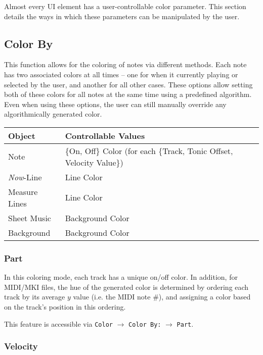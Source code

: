 \documentclass[english]{article}
\makeatletter
\newenvironment{restoretext}%
    {\@parboxrestore%
     \begin{adjustwidth}{}{\leftmargin}%
    }{\end{adjustwidth}
     }
\def\rcbegin{\begin{restoretext}\centering}
\def\rcend{\end{restoretext}}
\providecommand{\mi}[1]{\texttt{#1}}
\makeatother
\begin{document}
Almost every UI element has a user-controllable color parameter. This section details the ways in which these
parameters can be manipulated by the user.

\subsection{Color By}

This function allows for the coloring of notes via different methods. Each note has two associated colors at all times --
one for when it currently playing or selected by the user, and another for all other cases. These options allow
setting both of these colors for all notes at the same time using a predefined algorithm. Even when using these options,
the user can still manually override any algorithmically generated color.

\vspace{1em}

\rcbegin
\begin{tabular}{|l|l|}
  \hline
  \textbf{Object}           & \textbf{Controllable Values} \\
  \hline
  Note                    & \{On, Off\} Color (for each \{Track, Tonic Offset, Velocity Value\})\\
  \textit{Now}-Line       & Line Color \\
  Measure Lines           & Line Color \\
  Sheet Music             & Background Color \\
  Background              & Background Color \\
  \hline
\end{tabular}
\rcend

\vspace{1em}

\subsubsection{Part}

In this coloring mode, each track has a unique on/off color. In addition, for MIDI/MKI files, the hue of the generated
color is determined by ordering each track by its average $y$ value (i.e. the MIDI note \#), and assigning
a color based on the track's position in this ordering.

This feature is accessible via 
\mi{Color} $\rightarrow$ \mi{Color By:} $\rightarrow$ \mi{Part}.

\subsubsection{Velocity}
\end{document}
